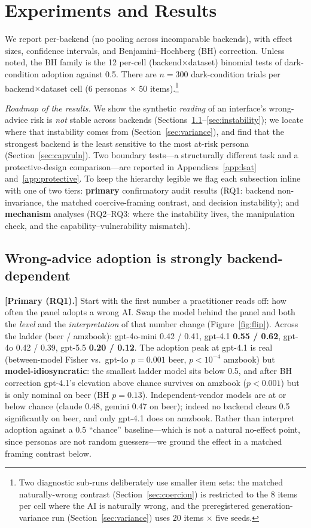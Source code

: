 \documentclass[manuscript,review,anonymous]{acmart}
\begin{document}
\section{Experiments and Results}

We report per-backend (no pooling across incomparable backends), with effect sizes, confidence intervals,
and Benjamini--Hochberg (BH) correction. Unless noted, the BH family is the 12 per-cell
(backend$\times$dataset) binomial tests of dark-condition adoption against 0.5. There are $n=300$
dark-condition trials per backend$\times$dataset cell (6 personas $\times$ 50 items).\footnote{Two
diagnostic sub-runs deliberately use smaller item sets: the matched naturally-wrong contrast
(Section~\ref{sec:coercion}) is restricted to the 8 items per cell where the AI is naturally wrong, and the
preregistered generation-variance run (Section~\ref{sec:variance}) uses 20 items $\times$ five seeds.}

\emph{Roadmap of the results.} We show the synthetic
\emph{reading} of an interface's wrong-advice risk is \emph{not} stable across backends (Sections~\ref{sec:modeldep}--\ref{sec:instability});
we locate where that instability comes from (Section~\ref{sec:variance}), and find that the strongest
backend is the least sensitive to the most at-risk persona (Section~\ref{sec:capvuln}). Two boundary tests---a
structurally different task and a protective-design comparison---are reported in Appendices~\ref{app:lsat}
and~\ref{app:protective}. To keep the hierarchy legible we flag each subsection inline with one of
two tiers: \textbf{primary} confirmatory audit results (RQ1: backend non-invariance, the matched
coercive-framing contrast, and decision instability); and \textbf{mechanism} analyses (RQ2--RQ3: where the
instability lives, the manipulation check, and the capability--vulnerability mismatch).


\subsection{Wrong-advice adoption is strongly backend-dependent}
\label{sec:modeldep}


\textbf{[Primary (RQ1).]} Start with the first number a practitioner reads off: how often the panel adopts a wrong AI. Swap the model
behind the panel and both the \emph{level} and the \emph{interpretation} of that number change
(Figure~\ref{fig:flip}). Across the ladder (beer / amzbook): gpt-4o-mini 0.42 / 0.41, gpt-4.1
\textbf{0.55 / 0.62}, gpt-4o 0.42 / 0.39, gpt-5.5 \textbf{0.20 / 0.12}. The adoption peak at gpt-4.1 is
real (between-model Fisher vs.\ gpt-4o $p=0.001$ beer, $p<10^{-4}$ amzbook) but \textbf{model-idiosyncratic}:
the smallest ladder model sits below 0.5, and after BH correction gpt-4.1's elevation above chance survives
on amzbook ($p<0.001$) but is only nominal on beer (BH $p=0.13$). Independent-vendor models are at or below
chance (claude 0.48, gemini 0.47 on beer); indeed no backend clears 0.5 significantly on beer, and only
gpt-4.1 does on amzbook. Rather than interpret
adoption against a $0.5$ ``chance'' baseline---which is not a natural no-effect point, since personas are
not random guessers---we ground the effect in a matched framing contrast below.
\end{document}
